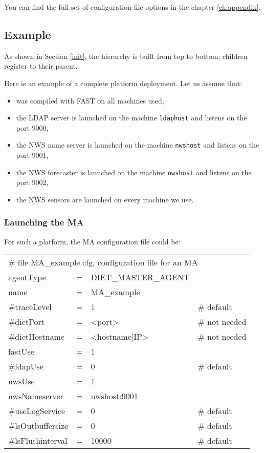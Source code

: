 You can find the full set of \diet configuration file options in the chapter
\ref{ch:appendix}.

\subsection{Example}
\label{sec:deploy_ex}

As shown in Section \ref{init}, the hierarchy is built from top to bottom:
children register to their parent.

Here is an example of a complete platform deployment. Let us assume that:

\begin{itemize}
\item \diet was compiled with FAST on all machines used,
\item the LDAP server is launched on the machine \texttt{ldaphost} and listens
  on the port 9000,
\item the NWS name server is launched on the machine \texttt{nwshost} and
  listens on the port 9001,
\item the NWS forecaster is launched on the machine \texttt{nwshost} and
  listens on the port 9002,
\item the NWS sensors are launched on every machine we use.
\end{itemize}


\subsubsection{Launching the MA}

For such a platform, the MA configuration file could be:
\tt
\begin{center}
 \footnotesize
 \begin{tabular}{lcll}
  \multicolumn{4}{l}{\# file MA\_example.cfg, configuration file for an MA}\\
  agentType     &=&DIET\_MASTER\_AGENT&\\
  name          &=&MA\_example        &\\
  \#traceLevel  &=&1                  &\# default\\
  \#dietPort    &=&<port>             &\# not needed\\
  \#dietHostname&=&<hostname|IP>      &\# not needed\\
  fastUse       &=&1                  &\\
  \#ldapUse     &=&0                  &\# default\\
  nwsUse        &=&1                  &\\
  nwsNameserver &=&nwshost:9001       &\\
  \#useLogService &=& 0               &\# default\\
  \#lsOutbuffersize &=& 0             &\# default\\
  \#lsFlushinterval &=& 10000           &\# default\\
 \end{tabular}
\end{center}
\rm

